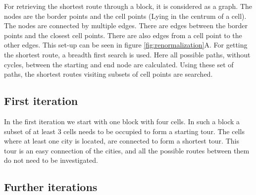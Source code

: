 For retrieving the shortest route through a block, it is considered as a graph.
The nodes are the border points and the cell points (Lying in the centrum of a
cell). The nodes are connected by multiple edges. There are edges between the
border points and the closest cell points. There are also edges from a cell
point to the other edges. This set-up can be seen in figure
\ref{fig:renormalization}A. For getting the shortest route, a breadth first
search is used. Here all possible paths, without cycles, between the starting
and end node are calculated. Using these set of paths, the shortest routes
visiting subsets of cell points are searched.

\subsection{First iteration}
In the first iteration we start with one block with four cells. In such a block
a subset of at least 3 cells needs to be occupied to form a starting tour. The
cells where at least one city is located, are connected to form a shortest
tour. This tour is an easy connection of the cities, and all the possible
routes between them do not need to be investigated.

\subsection{Further iterations}


